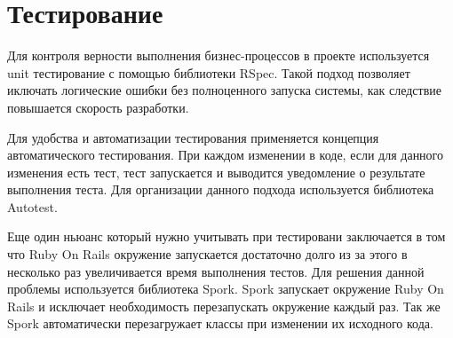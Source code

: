 \section{Тестирование}
Для контроля верности выполнения бизнес-процессов в проекте используется unit
тестирование с помощью библиотеки RSpec. Такой подход позволяет иключать
логические ошибки без полноценного запуска системы, как следствие повышается
скорость разработки.

Для удобства и автоматизации тестирования применяется концепция автоматического
тестирования. При каждом изменении в коде, если для данного изменения есть тест,
тест запускается и выводится уведомление о результате выполнения теста. Для
организации данного подхода используется библиотека Autotest.

Еще один ньюанс который нужно учитывать при тестировани заключается в том что
Ruby On Rails окружение запускается достаточно долго из за этого в несколько раз
увеличивается время выполнения тестов. Для решения данной проблемы используется
библиотека Spork. Spork запускает окружение Ruby On Rails и исключает
необходимость перезапускать окружение каждый раз. Так же Spork автоматически
перезагружает классы при изменении их исходного кода.
